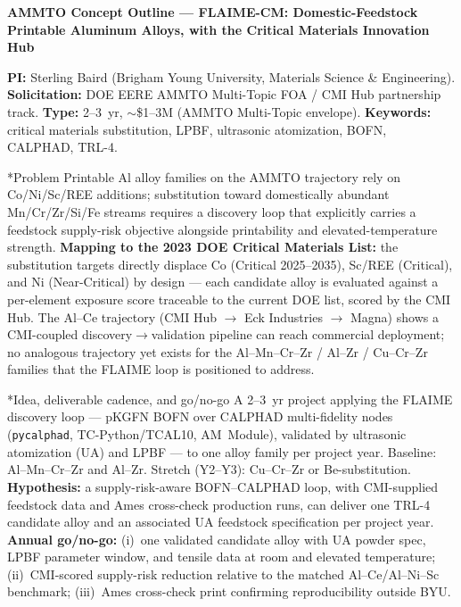 \documentclass[10pt]{article}
\makeatletter
\renewcommand{\section}{\@startsection{section}{1}{0pt}{0.4ex plus 0.1ex}{0.15ex}{\normalfont\bfseries}}
\makeatother
\begin{document}
\small

\begin{center}
{\bfseries AMMTO Concept Outline --- FLAIME-CM: Domestic-Feedstock Printable Aluminum Alloys, with the Critical Materials Innovation Hub}
\end{center}

{\small \textbf{PI:} Sterling Baird (Brigham Young University, Materials Science \& Engineering). \textbf{Solicitation:} DOE EERE AMMTO Multi-Topic FOA / CMI Hub partnership track. \textbf{Type:} 2--3~yr, $\sim$\$1--3M (AMMTO Multi-Topic envelope). \textbf{Keywords:} critical materials substitution, LPBF, ultrasonic atomization, BOFN, CALPHAD, TRL-4.}



\section*{Problem}
Printable Al alloy families on the AMMTO trajectory rely on Co/Ni/Sc/REE additions; substitution toward domestically abundant Mn/Cr/Zr/Si/Fe streams requires a discovery loop that explicitly carries a feedstock supply-risk objective alongside printability and elevated-temperature strength. \textbf{Mapping to the 2023 DOE Critical Materials List:} the substitution targets directly displace Co (Critical 2025--2035), Sc/REE (Critical), and Ni (Near-Critical) by design --- each candidate alloy is evaluated against a per-element exposure score traceable to the current DOE list, scored by the CMI Hub. The Al--Ce trajectory (CMI Hub $\to$ Eck Industries $\to$ Magna) shows a CMI-coupled discovery$\to$validation pipeline can reach commercial deployment; no analogous trajectory yet exists for the Al--Mn--Cr--Zr / Al--Zr / Cu--Cr--Zr families that the FLAIME loop is positioned to address.

\section*{Idea, deliverable cadence, and go/no-go}
A 2--3~yr project applying the FLAIME discovery loop --- pKGFN BOFN over CALPHAD multi-fidelity nodes (\texttt{pycalphad}, TC-Python/TCAL10, AM~Module), validated by ultrasonic atomization (UA) and LPBF --- to one alloy family per project year. Baseline: Al--Mn--Cr--Zr and Al--Zr. Stretch (Y2--Y3): Cu--Cr--Zr or Be-substitution. \textbf{Hypothesis:} a supply-risk-aware BOFN--CALPHAD loop, with CMI-supplied feedstock data and Ames cross-check production runs, can deliver one TRL-4 candidate alloy and an associated UA feedstock specification per project year. \textbf{Annual go/no-go:} (i)~one validated candidate alloy with UA powder spec, LPBF parameter window, and tensile data at room and elevated temperature; (ii)~CMI-scored supply-risk reduction relative to the matched Al--Ce/Al--Ni--Sc benchmark; (iii)~Ames cross-check print confirming reproducibility outside BYU.
\end{document}
